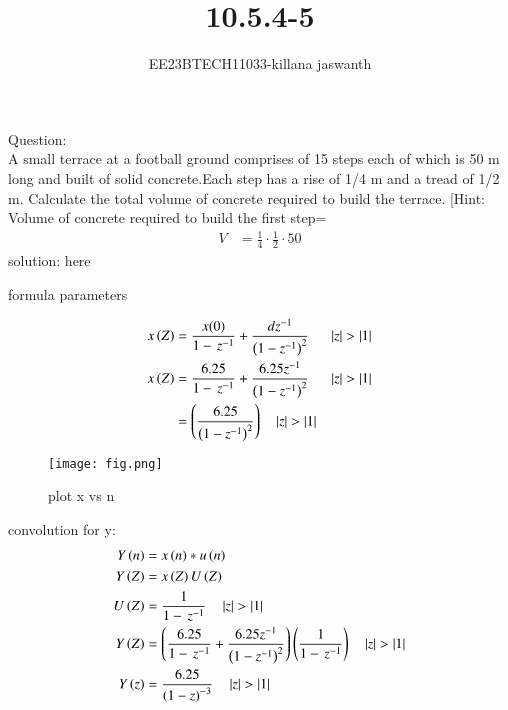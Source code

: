\documentclass[journal,12pt,twocolumn]{IEEEtran}
\theoremstyle{remark}
\begin{document}

\vspace{3cm}

\title{10.5.4-5}
\author{EE23BTECH11033-killana jaswanth}
\maketitle
\newpage

\bigskip

\renewcommand{\thefigure}{\theenumi}
\renewcommand{\thetable}{\theenumi}
Question:\\
A small terrace at a football ground comprises of 15 steps each of which is 50
m long and built of solid concrete.Each step has a rise of 1/4 m and a tread of
1/2 m. Calculate the total volume of concrete required to build the terrace.
[Hint: Volume of concrete required to build the first step=\begin{align}
    V&=\frac{1}{4} \cdot \frac{1}{2} \cdot 50 
\end{align}
solution:
here\begin{table}[!ht]
 \centering
  
   \caption{formula parameters}
   \label{tab:10.5.4.5}
   \end{table}
\begin{align}
x\left(Z\right)&=\frac{x(0)}{1-\,z^{-1}}+\frac{dz^{-1}}{\left(1-{z^{-1}}\right)^2}\:\:
\quad\left\vert z\right\vert>\left\vert1\right\vert\\
x\left(Z\right)&=\frac{6.25}{1-\,z^{-1}}+\frac{6.25z^{-1}}{\left(1-{z^{-1}}\right)^2}\:\:\quad\left\vert z\right\vert>\left\vert1\right\vert\\
&=\left(\frac{6.25}{\left(1-z^{-1}\right)^2}\right) \quad\left\vert z\right\vert>\left\vert1\right\vert\\
\end{align}
\begin{figure}[!ht]
    \centering
    \texttt{[image: fig.png]}
    \caption{plot x vs n}
    \label{fig:enter-label}
\end{figure}
convolution for y:\\
\begin{align}
Y\left(n\right)&=x\left(n\right)*u\left(n\right)\\
Y\left(Z\right)&=x\left(Z\right)U\left(Z\right)\\
U\left(Z\right)&=\frac{1}{1-\,z^{-1}}\quad\left\vert z\right\vert>\left\vert1\right\vert\\
Y\left(Z\right)&=\left(\frac{6.25}{1-\,z^{-1}}+\frac{6.25z^{-1}}{\left(1-{z^{-1}}\right)^2}\right)\left(\frac{1}{1-\,z^{-1}}\right)\quad\left\vert z\right\vert>\left\vert1\right\vert\\
Y\left(z\right)&=\frac{6.25}{\left(1-z\right)^{-3}} \quad\left\vert z\right\vert>\left\vert1\right\vert\\
\end{align}
\end{document}
